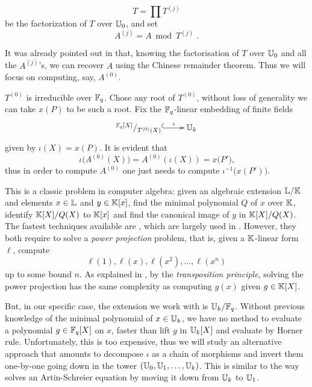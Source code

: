 \begin{equation}
  \label{eq:T}
  T = \prod T^{(j)}
\end{equation}
be the factorization of $T$ over $\mathbb{U}_0$, and set
\begin{equation}
  \label{eq:A}
  A^{(j)} = A \bmod T^{(j)}
  \;\text{.}
\end{equation}

It was already pointed out in \cite[$\S$2.3]{couveignes96} that,
knowing the factorisation of $T$ over $\mathbb{U}_0$ and all the $A^{(j)}$'s,
we can recover $A$ using the Chinese remainder theorem. Thus we will
focus on computing, say, $A^{(0)}$.

$T^{(0)}$ is irreducible over $\mathbb{F}_q$. Chose any root of $T^{(0)}$,
without loss of generality we can take $x(P)$ to be such a root.  Fix
the $\mathbb{F}_q$-linear embedding of finite fields
\begin{equation}
  \label{eq:embed}
  \xymatrix{
    ^{\F_q[X]}/_{T^{(0)}(X)} \ar@{^{(}->}[r]^-\iota & \U_k
  }
\end{equation}
given by $\iota(X) = x(P)$. It is evident that
\begin{equation}
  \iota\bigl(A^{(0)}(X)\bigr) = A^{(0)}\left(\iota(X)\right)=x\bigl(P'\bigr)
  \text{,}
\end{equation}
thus in order to compute $A^{(0)}$ one just needs to compute
$\iota^{-1}\bigl(x(P')\bigr)$.


This is a classic problem in computer algebra: given an algebraic
extension $\mathbb{L}/\mathbb{K}$ and elements $x\in\mathbb{L}$ and $y\in\mathbb{K}[x]$, find the
minimal polynomial $Q$ of $x$ over $\mathbb{K}$, identify $\mathbb{K}[X]/Q(X)$ to
$\mathbb{K}[x]$ and find the canonical image of $y$ in $\mathbb{K}[X]/Q(X)$. The
fastest techniques available are \cite{shoup99,PS06}, which are largely
used in \cite{DFS09}. However, they both require to solve a
\emph{power projection} problem, that is, given a $\mathbb{K}$-linear form
$\ell$, compute
\begin{equation}
  \ell(1), \ell(x), \ell(x^2), \dots, \ell(x^n)
\end{equation}
up to some bound $n$. As explained in \cite{shoup99}, by the
\emph{transposition principle}, solving the power projection has the
same complexity as computing $g(x)$ given $g\in\mathbb{K}[X]$.

But, in our specific case, the extension we work with is $\mathbb{U}_k/\mathbb{F}_q$.
Without previous knowledge of the minimal polynomial of $x\in\mathbb{U}_k$, we
have no method to evaluate a polynomial $g\in\mathbb{F}_q[X]$ on $x$, faster
than lift $g$ in $\mathbb{U}_k[X]$ and evaluate by Horner rule. Unfortunately,
this is too expensive, thus we will study an alternative approach that
amounts to decompose $\iota$ as a chain of morphisms and invert them
one-by-one going down in the tower $(\mathbb{U}_0,\mathbb{U}_1,\ldots,\mathbb{U}_k)$. This is
similar to the way \cite{couveignes00} solves an Artin-Schreier
equation by moving it down from $\mathbb{U}_k$ to $\mathbb{U}_1$.


